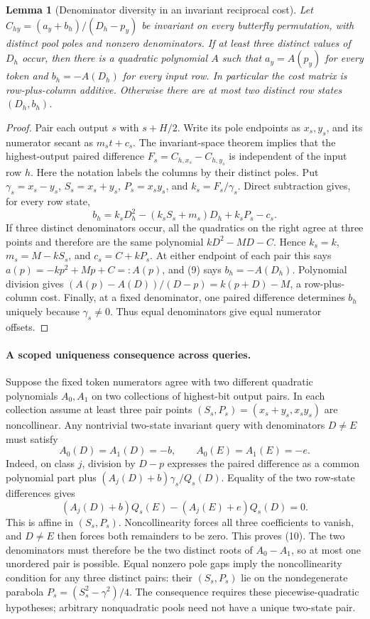 \documentclass[11pt]{article}
\newtheorem{lemma}{Lemma}
\begin{document}
\begin{lemma}[Denominator diversity in an invariant reciprocal cost]
Let $C_{hy}=(a_y+b_h)/(D_h-p_y)$ be invariant on every butterfly
permutation, with distinct pool poles and nonzero denominators.
If at least three distinct values of $D_h$ occur, then there is a
quadratic polynomial $A$ such that $a_y=A(p_y)$ for every token and
$b_h=-A(D_h)$ for every input row. In particular the cost matrix is
row-plus-column additive. Otherwise there are at most two distinct
row states $(D_h,b_h)$.
\end{lemma}
\begin{proof}
Pair each output $s$ with $s+H/2$. Write its pole endpoints as
$x_s,y_s$, and its numerator secant as $m_st+c_s$.
The invariant-space theorem implies that the highest-output paired
difference $F_s=C_{h,x_s}-C_{h,y_s}$ is independent of the input row
$h$. Here the notation labels the columns by their distinct poles.
Put $\gamma_s=x_s-y_s$, $S_s=x_s+y_s$, $P_s=x_sy_s$, and
$k_s=F_s/\gamma_s$. Direct subtraction gives, for every row state,
\[
 b_h=k_sD_h^2-(k_sS_s+m_s)D_h+k_sP_s-c_s.             \tag{9}
\]
If three distinct denominators occur, all the quadratics on the
right agree at three points and therefore are the same polynomial
$kD^2-MD-C$. Hence $k_s=k$, $m_s=M-kS_s$, and $c_s=C+kP_s$.
At either endpoint of each pair this says
$a(p)=-kp^2+Mp+C=:A(p)$, and (9) says $b_h=-A(D_h)$.
Polynomial division gives
$(A(p)-A(D))/(D-p)=k(p+D)-M$, a row-plus-column cost.
Finally, at a fixed denominator, one paired difference determines
$b_h$ uniquely because $\gamma_s\ne0$. Thus equal denominators
give equal numerator offsets.
\end{proof}

\paragraph{A scoped uniqueness consequence across queries.}
Suppose the fixed token numerators agree with two different quadratic
polynomials $A_0,A_1$ on two collections of highest-bit output pairs.
In each collection assume at least three pair points
$(S_s,P_s)=(x_s+y_s,x_sy_s)$ are noncollinear. Any nontrivial
two-state invariant query with denominators $D\ne E$ must satisfy
\[
 A_0(D)=A_1(D)=-b,\qquad A_0(E)=A_1(E)=-e.            \tag{10}
\]
Indeed, on class $j$, division by $D-p$ expresses the paired
difference as a common polynomial part plus
$(A_j(D)+b)\gamma_s/Q_s(D)$.
Equality of the two row-state differences gives
\[
 (A_j(D)+b)Q_s(E)-(A_j(E)+e)Q_s(D)=0.
\]
This is affine in $(S_s,P_s)$. Noncollinearity forces all three
coefficients to vanish, and $D\ne E$ then forces both remainders
to be zero. This proves (10). The two denominators must therefore
be the two distinct roots of $A_0-A_1$, so at most one unordered
pair is possible. Equal nonzero pole gaps imply the noncollinearity
condition for any three distinct pairs: their $(S_s,P_s)$ lie on
the nondegenerate parabola $P_s=(S_s^2-\gamma^2)/4$.
The consequence requires these piecewise-quadratic hypotheses;
arbitrary nonquadratic pools need not have a unique two-state pair.
\end{document}
